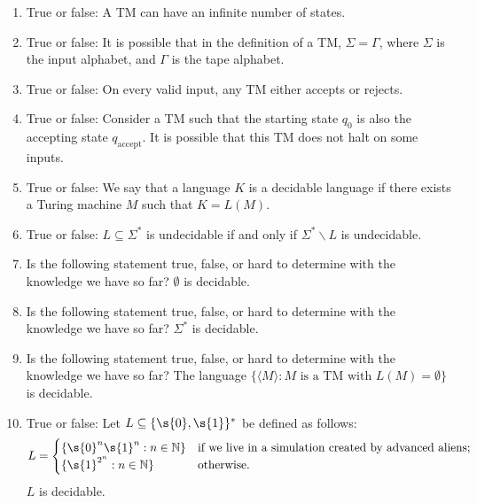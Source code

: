 \begin{enumerate}
    \item True or false: A TM can have an infinite number of states.
    \item True or false: It is possible that in the definition of a TM, $\Sigma = \Gamma$, where $\Sigma$ is the input alphabet, and $\Gamma$ is the tape alphabet.
    \item True or false: On every valid input, any TM either accepts or rejects.
    \item True or false: Consider a TM such that the starting state $q_0$ is also the accepting state $q_{\text{accept}}$. It is possible that this TM does not halt on some inputs.
    \item True or false: We say that a language $K$ is a decidable language if there exists a Turing machine $M$ such that $K = L(M)$.
    \item True or false: $L \subseteq \Sigma^*$ is undecidable if and only if $\Sigma^* \backslash L$ is undecidable. 
    \item Is the following statement true, false, or hard to determine with the knowledge we have so far? $\emptyset$ is decidable.
    \item Is the following statement true, false, or hard to determine with the knowledge we have so far? $\Sigma^*$ is decidable.
    \item Is the following statement true, false, or hard to determine with the knowledge we have so far? The language $\{\langle M \rangle : \text{$M$ is a TM with $L(M) = \emptyset$}\}$ is decidable.
    \item True or false: Let $L \subseteq \{\s{0},\s{1}\}^*$ be defined as follows:
    \[
        L = \begin{cases}
        \{\s{0}^n\s{1}^n : n \in \mathbb{N}\} & \text{if we live in a simulation created by advanced aliens;} \\
        \{\s{1}^{2^n} : n \in \mathbb{N}\} & \text{otherwise.}
        \end{cases}
    \]
    $L$ is decidable. 
\end{enumerate}

